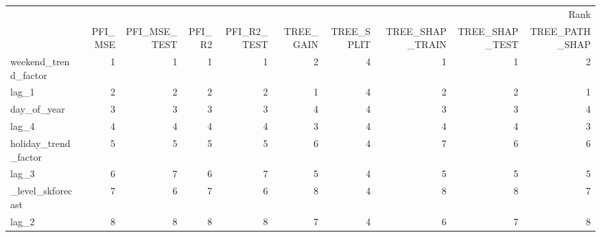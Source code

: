 \begin{tabular}{lrrrrrrrrr}
\toprule
 & \multicolumn{9}{r}{Rank} \\
 & PFI_MSE & PFI_MSE_TEST & PFI_R2 & PFI_R2_TEST & TREE_GAIN & TREE_SPLIT & TREE_SHAP_TRAIN & TREE_SHAP_TEST & TREE_PATH_SHAP \\
\midrule
weekend_trend_factor & 1 & 1 & 1 & 1 & 2 & 4 & 1 & 1 & 2 \\
lag_1 & 2 & 2 & 2 & 2 & 1 & 4 & 2 & 2 & 1 \\
day_of_year & 3 & 3 & 3 & 3 & 4 & 4 & 3 & 3 & 4 \\
lag_4 & 4 & 4 & 4 & 4 & 3 & 4 & 4 & 4 & 3 \\
holiday_trend_factor & 5 & 5 & 5 & 5 & 6 & 4 & 7 & 6 & 6 \\
lag_3 & 6 & 7 & 6 & 7 & 5 & 4 & 5 & 5 & 5 \\
_level_skforecast & 7 & 6 & 7 & 6 & 8 & 4 & 8 & 8 & 7 \\
lag_2 & 8 & 8 & 8 & 8 & 7 & 4 & 6 & 7 & 8 \\
\bottomrule
\end{tabular}
